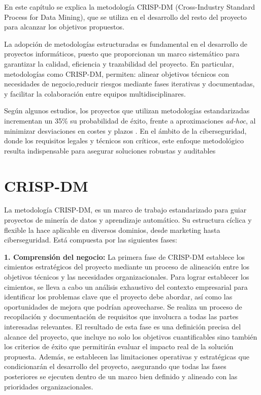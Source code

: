 
En este capítulo se explica la metodología CRISP-DM (Cross-Industry Standard Process for Data Mining), que se utiliza en el desarrollo del resto del proyecto para alcanzar los objetivos propuestos.

La adopción de metodologías estructuradas es fundamental en el desarrollo de proyectos informáticos, puesto que proporcionan un marco sistemático para garantizar la calidad, eficiencia y trazabilidad del proyecto. En particular, metodologías como CRISP-DM, permiten: alinear objetivos técnicos con necesidades de negocio,reducir riesgos mediante fases iterativas y documentadas, y facilitar la colaboración entre equipos multidisciplinares.

Según algunos estudios, los proyectos que utilizan metodologías estandarizadas incrementan un 35\% su probabilidad de éxito, frente a aproximaciones \textit{ad-hoc}, al minimizar desviaciones en costes y plazos \cite{chapman2000crisp}. En el ámbito de la ciberseguridad, donde los requisitos legales y técnicos son críticos, este enfoque metodológico resulta indispensable para asegurar soluciones robustas y auditables

\section{CRISP-DM}
La metodología CRISP-DM, es un marco de trabajo estandarizado para guiar proyectos de minería de datos y aprendizaje automático. Su estructura cíclica y flexible la hace aplicable en diversos dominios, desde marketing hasta ciberseguridad. Está compuesta por las siguientes fases:

\textbf{1. Comprensión del negocio:} La primera fase de CRISP-DM establece los cimientos estratégicos del proyecto mediante un proceso de alineación entre los objetivos técnicos y las necesidades organizacionales. Para lograr establecer los cimientos, se lleva a cabo un análisis exhaustivo del contexto empresarial para identificar los problemas clave que el proyecto debe abordar, así como las oportunidades de mejora que podrían aprovecharse. Se realiza un proceso de recopilación y documentación de requisitos que involucra a todas las partes interesadas relevantes. El resultado de esta fase es una definición precisa del alcance del proyecto, que incluye no solo los objetivos cuantificables sino también los criterios de éxito que permitirán evaluar el impacto real de la solución propuesta. Además, se establecen las limitaciones operativas y estratégicas que condicionarán el desarrollo del proyecto, asegurando que todas las fases posteriores se ejecuten dentro de un marco bien definido y alineado con las prioridades organizacionales.


